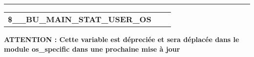 \documentclass[a4paper,10pt]{article}
\begin{document}

\par\noindent\rule{\textwidth}{0.4pt}

\begin{justify}
    \begin{tabular}{l|l|l}
        \textbf{\color{vars}\$\_\_BU\_MAIN\_STAT\_USER\_OS}   & &\\[1\baselineskip]
    \end{tabular}
\end{justify}

\begin{justify}
    \textbf{ATTENTION : Cette variable est dépreciée et sera déplacée dans le module \textbf{\color{path}os\_specific} dans une prochaine mise à jour}
\end{justify}
\end{document}
